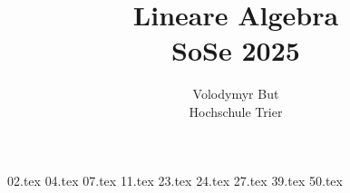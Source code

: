 \documentclass[10pt, oneside]{article}
\title{Lineare Algebra\\[10pt]\Large{SoSe 2025}}
\author{Volodymyr But\\[10pt]Hochschule Trier}
\date{}
\begin{document}
\maketitle
\vspace{25px}

{02.tex}
{04.tex}
{07.tex}
{11.tex}
{23.tex}
{24.tex}
{27.tex}
\pagebreak
{39.tex}
{50.tex}
\end{document}
